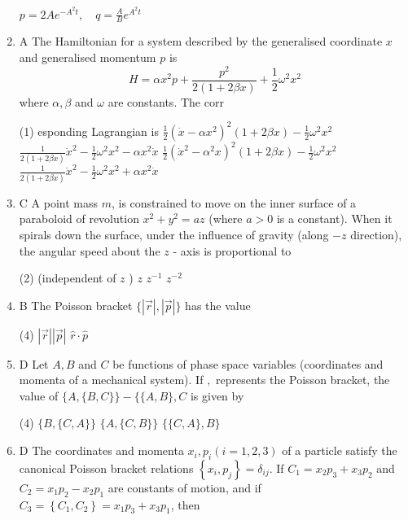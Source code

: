 \begin{enumerate}
\begin{tasks}
	\task[\textbf{d.}] $p=2 A e^{-A^{2} t}, \quad q=\frac{A}{B} e^{A^{2} t}$
\end{tasks}
\item A The Hamiltonian for a system described by the generalised coordinate $x$ and generalised momentum $p$ is
$$
H=\alpha x^{2} p+\frac{p^{2}}{2(1+2 \beta x)}+\frac{1}{2} \omega^{2} x^{2}
$$
where $\alpha, \beta$ and $\omega$ are constants. The corr
{}
 \begin{tasks}(1)
	\task[\textbf{a.}]esponding Lagrangian is
	 $\frac{1}{2}\left(\dot{x}-\alpha x^{2}\right)^{2}(1+2 \beta x)-\frac{1}{2} \omega^{2} x^{2}$
	\task[\textbf{b.}]$\frac{1}{2(1+2 \beta x)} \dot{x}^{2}-\frac{1}{2} \omega^{2} x^{2}-\alpha x^{2} \dot{x}$
	\task[\textbf{c.}]$\frac{1}{2}\left(\dot{x}^{2}-\alpha^{2} x\right)^{2}(1+2 \beta x)-\frac{1}{2} \omega^{2} x^{2}$
	\task[\textbf{d.}] $\frac{1}{2(1+2 \beta x)} \dot{x}^{2}-\frac{1}{2} \omega^{2} x^{2}+\alpha x^{2} \dot{x}$
\end{tasks}
\item C A point mass $m$, is constrained to move on the inner surface of a paraboloid of revolution $x^{2}+y^{2}=a z$ (where $a>0$ is a constant). When it spirals down the surface, under the influence of gravity (along $-z$ direction), the angular speed about the $z$ - axis is proportional to
{}
 \begin{tasks}(2)
	 (independent of $z$ )
	\task[\textbf{b.}]$z$
	\task[\textbf{c.}] $z^{-1}$
	\task[\textbf{d.}]  $z^{-2}$
\end{tasks}
\item B The Poisson bracket $\{|\vec{r}|,|\vec{p}|\}$ has the value
{}
 \begin{tasks}(4)
	\task[\textbf{a.}]$|\vec{r}||\vec{p}|$
	\task[\textbf{b.}]$\hat{r} \cdot \hat{p}$
\end{tasks}
\item D Let $A, B$ and $C$ be functions of phase space variables (coordinates and momenta of a mechanical system). If ${,}$ represents the Poisson bracket, the value of $\{A,\{B, C\}\}-\{\{A, B\}, C$ is given by
{}
 \begin{tasks}(4)
	\task[\textbf{b.}]$\{B,\{C, A\}\}$
	\task[\textbf{c.}]$\{A,\{C, B\}\}$
	\task[\textbf{d.}] $\{\{C, A\}, B\}$
\end{tasks}
\item D The coordinates and momenta $x_{i}, p_{i}(i=1,2,3)$ of a particle satisfy the canonical Poisson bracket relations $\left\{x_{i}, p_{j}\right\}=\delta_{i j}$. If $C_{1}=x_{2} p_{3}+x_{3} p_{2}$ and $C_{2}=x_{1} p_{2}-x_{2} p_{1}$ are constants of motion, and if $C_{3}=\left\{C_{1}, C_{2}\right\}=x_{1} p_{3}+x_{3} p_{1}$, then

\end{enumerate}
